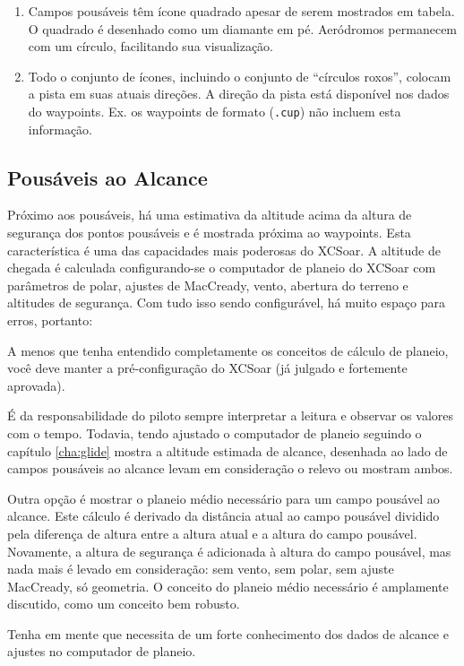 \begin{enumerate}
\item  Campos pousáveis têm ícone quadrado apesar de serem mostrados em tabela.  O quadrado é desenhado como um diamante em pé.  Aeródromos permanecem com um círculo, facilitando sua visualização. 
\item  Todo o conjunto de ícones, incluindo o conjunto de “círculos roxos”, colocam a pista em suas atuais direções.  A direção da pista está disponível nos dados do waypoints.  Ex. os waypoints de formato (\verb|.cup|) não incluem esta informação.
\end{enumerate}

\subsection*{Pousáveis ao Alcance}
Próximo aos pousáveis, há uma estimativa da altitude acima da altura de segurança dos 
pontos pousáveis e é mostrada próxima ao waypoints.  Esta característica é uma das 
capacidades mais poderosas do XCSoar.  A altitude de chegada é calculada configurando-se 
o computador de planeio do XCSoar com parâmetros de polar, ajustes de MacCready, vento, 
abertura do terreno e altitudes de segurança.  Com tudo isso sendo configurável, há muito 
espaço para erros, portanto:

A menos que tenha entendido completamente os conceitos de cálculo de planeio, você deve 
\warning manter a pré-configuração do XCSoar (já julgado e fortemente aprovada).

É da responsabilidade do piloto sempre interpretar a leitura e observar os valores com o 
tempo.  Todavia, tendo ajustado o computador de planeio seguindo o capítulo 
\ref{cha:glide} mostra a altitude estimada de alcance, desenhada ao lado de campos pousáveis ao alcance levam em consideração o relevo ou mostram ambos.

Outra opção é mostrar o planeio médio necessário para um campo pousável ao alcance.  Este cálculo é derivado da distância atual ao campo pousável dividido pela diferença de altura entre a altura atual e a altura do campo pousável.  Novamente, a altura de segurança é adicionada à altura do campo pousável, mas nada mais é levado em consideração: sem vento, sem polar, sem ajuste MacCready, só geometria.  O conceito do planeio médio necessário é amplamente discutido, como um conceito bem robusto.

\tip Tenha em mente que necessita de um forte conhecimento dos dados de alcance e ajustes no computador de planeio.

